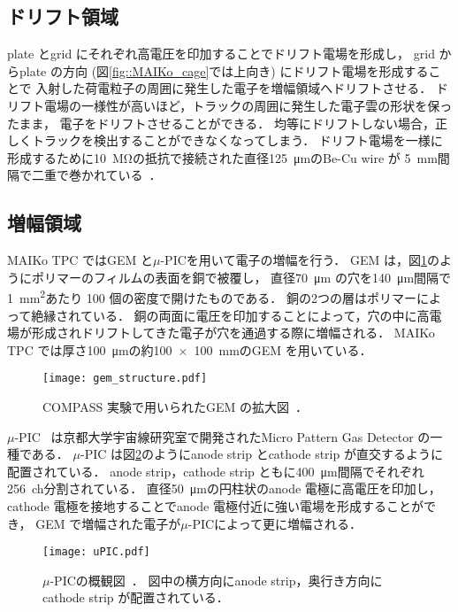 \documentclass[../master]{subfiles}
\begin{document}
\subsection{ドリフト領域}
plate とgrid にそれぞれ高電圧を印加することでドリフト電場を形成し，
grid からplate の方向 (図\ref{fig::MAIKo_cage}では上向き) にドリフト電場を形成することで
入射した荷電粒子の周囲に発生した電子を増幅領域へドリフトさせる．
ドリフト電場の一様性が高いほど，トラックの周囲に発生した電子雲の形状を保ったまま，
電子をドリフトさせることができる．
均等にドリフトしない場合，正しくトラックを検出することができなくなってしまう．
ドリフト電場を一様に形成するために\SI{10}{\mega\ohm}の抵抗で接続された直径\SI{125}{\micro\metre}のBe-Cu wire が
\SI{5}{\milli\metre}間隔で二重で巻かれている~\cite{furuno}．

\subsection{増幅領域}
MAIKo TPC ではGEM と$\mu$-PICを用いて電子の増幅を行う．
GEM は，図\ref{pic::GEM}のようにポリマーのフィルムの表面を銅で被覆し，
直径\SI{70}{\micro\metre} の穴を\SI{140}{\micro\metre}間隔で\SI{1}{\square\milli\metre}あたり
100 個の密度で開けたものである．
銅の2つの層はポリマーによって絶縁されている．
銅の両面に電圧を印加することによって，穴の中に高電場が形成されドリフトしてきた電子が穴を通過する際に増幅される．
MAIKo TPC では厚さ\SI{100}{\micro\metre}の約\SI{100x100}{\milli\metre}のGEM を用いている．
\begin{figure}
  \centering
  \texttt{[image: gem\_structure.pdf]}
  \caption{COMPASS 実験で用いられたGEM の拡大図~\cite{gem_compass}．}
  \label{pic::GEM}  
\end{figure}

$\mu$-PIC~\cite{mupic} は京都大学宇宙線研究室で開発されたMicro Pattern Gas Detector の一種である．
$\mu$-PIC は図\ref{fig::mupic}のようにanode strip とcathode strip が直交するように配置されている．
anode strip，cathode strip ともに\SI{400}{\micro\metre}間隔でそれぞれ256~ch分割されている．
直径\SI{50}{\micro\metre}の円柱状のanode 電極に高電圧を印加し，
cathode 電極を接地することでanode 電極付近に強い電場を形成することができ，
GEM で増幅された電子が$\mu$-PICによって更に増幅される．
\begin{figure}
  \centering
  \texttt{[image: uPIC.pdf]}
  \caption[$\mu$-PICの概観図．]{$\mu$-PICの概観図~\cite{mupic}．
    図中の横方向にanode strip，奥行き方向にcathode strip が配置されている．
  }
  \label{fig::mupic}
\end{figure}
\end{document}
